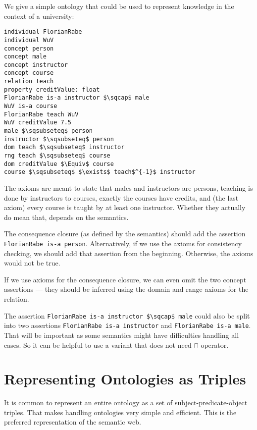 \begin{example}\label{ex:bol}
We give a simple ontology that could be used to represent knowledge in the context of a university:

\begin{lstlisting}
individual FlorianRabe
individual WuV
concept person
concept male
concept instructor
concept course
relation teach
property creditValue: float
FlorianRabe is-a instructor $\sqcap$ male
WuV is-a course
FlorianRabe teach WuV
WuV creditValue 7.5
male $\sqsubseteq$ person
instructor $\sqsubseteq$ person
dom teach $\sqsubseteq$ instructor
rng teach $\sqsubseteq$ course
dom creditValue $\Equiv$ course
course $\sqsubseteq$ $\exists$ teach$^{-1}$ instructor
\end{lstlisting}

The axioms are meant to state that males and instructors are persons, teaching is done by instructors to courses, exactly the courses have credits, and (the last axiom) every course is taught by at least one instructor.
Whether they actually do mean that, depends on the semantics.

The consequence closure (as defined by the semantics) should add the assertion \verb|FlorianRabe is-a person|.
Alternatively, if we use the axioms for consistency checking, we should add that assertion from the beginning.
Otherwise, the axioms would not be true.

If we use axioms for the consequence closure, we can even omit the two concept assertions --- they should be inferred using the domain and range axioms for the relation.

The assertion \lstinline|FlorianRabe is-a instructor $\sqcap$ male| could also be split into two assertions
\lstinline|FlorianRabe is-a instructor| and \lstinline|FlorianRabe is-a male|.
That will be important as some semantics might have difficulties handling all cases.
So it can be helpful to use a variant that does not need $\sqcap$ operator.
\end{example}

\section{Representing Ontologies as Triples}\label{sec:onto:triple}

It is common to represent an entire ontology as a set of subject-predicate-object triples.
That makes handling ontologies very simple and efficient.
This is the preferred representation of the semantic web.

